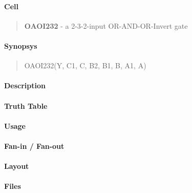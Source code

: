 \label{OAOI232}
\paragraph{Cell}
\begin{quote}
    \textbf{OAOI232} - a 2-3-2-input OR-AND-OR-Invert gate
\end{quote}

\paragraph{Synopsys}
\begin{quote}
    OAOI232(Y, C1, C, B2, B1, B, A1, A)
\end{quote}

\paragraph{Description}

%

\paragraph{Truth Table}
%

\paragraph{Usage}

\paragraph{Fan-in / Fan-out}

\paragraph{Layout}

\paragraph{Files}
